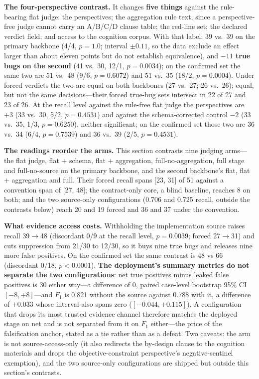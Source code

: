 \documentclass[acmsmall,screen,review,anonymous]{acmart}
\begin{document}
\textbf{The four-perspective contrast.} It changes \textbf{five things} against the rule-bearing
flat judge: the perspectives; the aggregation rule text, since a perspective-free judge cannot carry
an A/B/C/D clause table; the red-line set; the declared verdict field; and access to the cognition
corpus. With that label: 39 vs.\ 39 on the primary backbone (4/4, $p{=}1.0$; interval $\pm0.11$, so
the data exclude an effect larger than about eleven points but do not establish equivalence), and
\textbf{$-11$ true bugs on the second} (41 vs.\ 30, 12/1, $p{=}0.0034$); on the confirmed set the
same two are 51 vs.\ 48 (9/6, $p{=}0.6072$) and 51 vs.\ 35 (18/2, $p{=}0.0004$). Under forced verdicts the
two are equal on both backbones (27 vs.\ 27; 26 vs.\ 26); equal, but not the same decisions---their
forced true-bug sets intersect in 22 of 27 and 23 of 26. At the recall level against the rule-free
flat judge the perspectives are $+3$ (33 vs.\ 30, 5/2, $p{=}0.4531$) and against the
schema-corrected control $-2$ (33 vs.\ 35, 1/3, $p{=}0.6250$), neither significant; on the confirmed
set those two are 36 vs.\ 34 (6/4, $p{=}0.7539$) and 36 vs.\ 39 (2/5, $p{=}0.4531$).

\textbf{The readings reorder the arms.} This section contrasts nine judging arms---the flat judge,
flat $+$ schema, flat $+$ aggregation, full-no-aggregation, full stage and full-no-source on the
primary backbone, and the second backbone's flat, flat $+$ aggregation and full. Their forced recall
spans [23, 31] of 51 against a convention span of [27, 48]; the contract-only core, a blind baseline,
reaches 8 on both; and the two source-only configurations (0.706 and 0.725 recall, outside the
contrasts below) reach 20 and 19 forced and 36 and 37 under the convention.

\textbf{What evidence access costs.} Withholding the implementation source raises recall
39$\to$48 (discordant 0/9 at the recall level, $p{=}0.0039$; forced 27$\to$31) and cuts suppression
from 21/30 to 12/30, so it buys nine true bugs and releases nine more false positives. On the
confirmed set the same contrast is 48 vs 66 (discordant 0/18, $p{<}0.0001$). \textbf{The deployment's
summary metrics do not separate the two configurations}: net true positives minus leaked false
positives is 30 either way---a difference of 0, paired case-level bootstrap 95\% CI $[-8,+8]$---and
$F_1$ is 0.821 without the source against 0.788 with it, a difference of $+0.033$ whose interval also
spans zero ($[-0.044,+0.115]$). A configuration that drops its most trusted evidence channel
therefore matches the deployed stage on net and is not separated from it on $F_1$ either---the price
of the falsification anchor, stated as a tie rather than as a defeat. Two caveats: the arm is not
source-access-only (it also redirects the by-design clause to the cognition materials and drops the
objective-constraint perspective's negative-sentinel exemption), and the two source-only
configurations are shipped but outside this section's contrasts.
\end{document}
